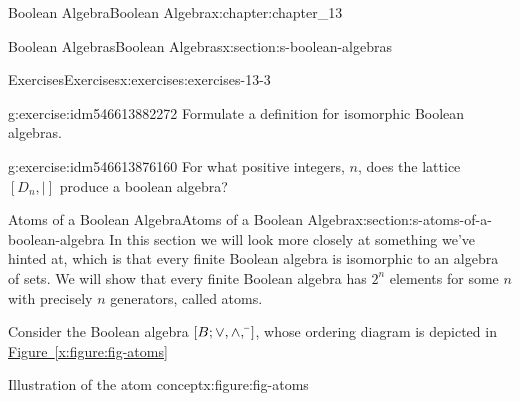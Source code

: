 \documentclass[oneside,10pt,]{book}
\newcommand{\xreffont}{\relax}
\numberwithin{equation}{section}
\begin{document}
\begin{chapterptx}{Boolean Algebra}{}{Boolean Algebra}{}{}{x:chapter:chapter_13}
\begin{sectionptx}{Boolean Algebras}{}{Boolean Algebras}{}{}{x:section:s-boolean-algebras}
\begin{exercises-subsection}{Exercises}{}{Exercises}{}{}{x:exercises:exercises-13-3}
\begin{divisionexercise}{7}{}{}{g:exercise:idm546613882272}
Formulate a definition for isomorphic Boolean algebras.%
\end{divisionexercise}%
\begin{divisionexercise}{8}{}{}{g:exercise:idm546613876160}%
For what positive integers, \(n\), does the lattice \([D_n,\mid]\) produce a boolean algebra?%
\end{divisionexercise}%
\end{exercises-subsection}
\end{sectionptx}
%
%
\typeout{************************************************}
\typeout{************************************************}
%
\begin{sectionptx}{Atoms of a Boolean Algebra}{}{Atoms of a Boolean Algebra}{}{}{x:section:s-atoms-of-a-boolean-algebra}
In this section we will look more closely at something we've hinted at, which is that every finite Boolean algebra is isomorphic to an algebra of sets. We will show that every finite Boolean algebra has \(2^n\) elements for some \(n\) with precisely \(n\) generators, called atoms.%
\par
Consider the Boolean algebra \([B;  \lor , \land, \bar{}{\hspace{3 pt}}]\), whose ordering diagram is depicted in \hyperref[x:figure:fig-atoms]{Figure~{\xreffont\ref{x:figure:fig-atoms}}}%
\begin{figureptx}{Illustration of the atom concept}{x:figure:fig-atoms}{}%
\begin{image}{0.25}{0.5}{0.25}%

\end{image}
\end{figureptx}
\end{sectionptx}
\end{chapterptx}
\end{document}
